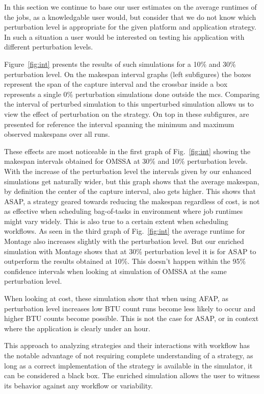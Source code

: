 \documentclass[10pt,conference,compsocconf]{IEEEtran}
\begin{document}
In this section we  continue to base our user estimates  on the average runtimes
of the  jobs, as a  knowledgable user  would, but consider  that we do  not know
which perturbation  level is appropriate for the given platform  and application
strategy.   In such  a  situation a  user  would be  interested  on testing  his
application with different perturbation levels.

Figure~\ref{fig:int} presents  the results  of such simulations  for a  10\% and
30\% perturbation level.  On the  makespan interval graphs (left subfigures) the
boxes represent the span  of the capture interval and the  crossbar inside a box
represents   a   single   0\%   perturbation  simulations   done   outside   the
\ac{mcs}. Comparing  the interval  of perturbed  simulation to  this unperturbed
simulation allows us to view the effect  of perturbation on the strategy. On top
in  these subfigures,  are presented  for  reference the  interval spanning  the
minimum and maximum observed makespans over all runs.

These  effects are  most noticeable  in  the first  graph of  Fig.~\ref{fig:int}
showing the makespan intervals obtained for  OMSSA at 30\% and 10\% perturbation
levels. With the  increase of the perturbation level the  intervals given by our
enhanced simulations get naturally wider, but  this graph shows that the average
makespan, by  definition the center of  the capture interval, also  gets higher.
This shows that ASAP, a strategy geared towards reducing the makespan regardless
of cost, is  not as effective when scheduling bag-of-tasks  in environment where
job runtimes  might vary  widely. This  is also  true to  a certain  extent when
scheduling  workflows. As  seen in  the  third graph  of Fig.~\ref{fig:int}  the
average runtime for Montage also increases slightly with the perturbation level.
But our enriched  simulation with Montage shows that at  30\% perturbation level
it is for ASAP  to outperform the results obtained at  10\%. This doesn't happen
within the 95\% confidence intervals when  looking at simulation of OMSSA at the
same perturbation level.

When looking at cost, these simulation show that when using AFAP, as
perturbation level increases low BTU count runs become less likely to occur and
higher BTU counts become possible. This is not the case for ASAP, or in context
where the application is clearly under an hour.

This approach to analyzing strategies and their interactions with workflow has
the notable advantage of not requiring complete understanding of a strategy, as
long as a correct implementation of the strategy is available in the simulator,
it can be considered a black box. The enriched simulation allows the user to
witness its behavior against any workflow or variability.
\end{document}

